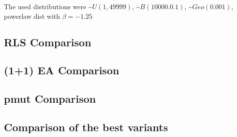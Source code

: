 The used distributions were \textasciitilde$U(1,49999)$, \textasciitilde$B(10000.0.1)$, \textasciitilde$Geo(0.001)$, powerlaw dist with $\beta=-1.25$
\subsection{RLS Comparison}





\subsection{(1+1) EA Comparison}





\subsection{pmut Comparison}





\subsection{Comparison of the best variants}









